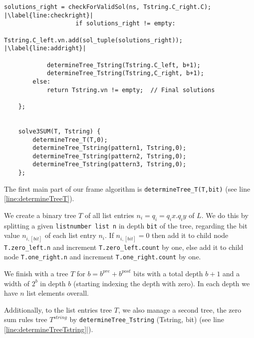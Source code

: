 \begin{lstlisting}[caption={The \texttt{3SUM} frame algorithm}, label=lst:3sumframealgorithm]
                    solutions_right = checkForValidSol(ns, Tstring.C_right.C);      |\label{line:checkright}|
                    if solutions_right != empty:
                        Tstring.C_left.vn.add(sol_tuple(solutions_right));          |\label{line:addright}|

            determineTree_Tstring(Tstring.C_left, b+1);
            determineTree_Tstring(Tstring,C_right, b+1);
        else:
            return Tstring.vn != empty;  // Final solutions

    };


    solve3SUM(T, Tstring) {
        determineTree_T(T,0);
        determineTree_Tstring(pattern1, Tstring,0);
        determineTree_Tstring(pattern2, Tstring,0);
        determineTree_Tstring(pattern3, Tstring,0);
    };

\end{lstlisting}


The first main part of our frame algorithm is \texttt{determineTree\_T(T,bit)} (see line \ref{line:determineTreeT}). 

\begin{step}
    We create a binary tree $T$ of all list entries $n_{i} = q_{i} = q_{i}x.q_{i}y$ of $L$. We do this by splitting a given \texttt{listnumber list n} in depth \texttt{bit} of the tree, regarding the bit value $n_{i,[bit]}$ of each list entry $n_{i}$. If $n_{i,[bit]} = 0$ then add it to child node \texttt{T.zero\_left.n} and increment \texttt{T.zero\_left.count} by one, else add it to child node \texttt{T.one\_right.n} and increment \texttt{T.one\_right.count} by one.
\label{step:creationoflistentriestree}
\end{step}

We finish with a tree $T$ for $b = b^{pre} + b^{post}$ bits with a total depth $b+1$ and a width of $2^{b}$ in depth $b$ (starting indexing the depth with zero). In each depth we have $n$ list elements overall.

Additionally, to the list entries tree $T$, we also manage a second tree, the zero sum rules tree $T^{string}$ by \texttt{determineTree\_Tstring} (Tstring, bit) (see line \ref{line:determineTreeTstring}|).


